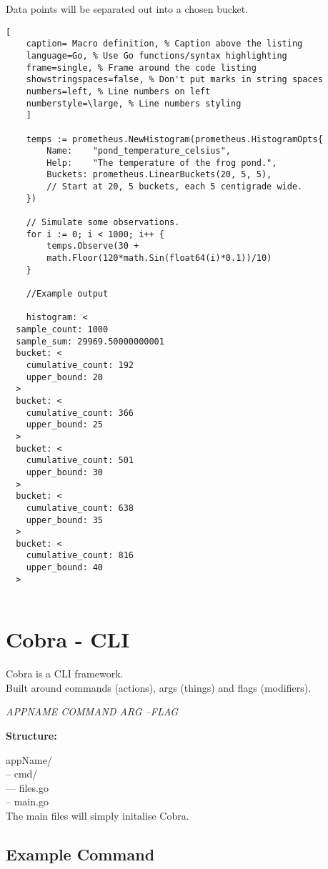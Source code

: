\documentclass[11pt]{scrartcl} %
\begin{document}
Data points will be separated out into a chosen bucket.

\begin{lstlisting}[
	caption= Macro definition, % Caption above the listing
	language=Go, % Use Go functions/syntax highlighting
	frame=single, % Frame around the code listing
	showstringspaces=false, % Don't put marks in string spaces
	numbers=left, % Line numbers on left
	numberstyle=\large, % Line numbers styling
	]

	temps := prometheus.NewHistogram(prometheus.HistogramOpts{
		Name:    "pond_temperature_celsius",
		Help:    "The temperature of the frog pond.", 
		Buckets: prometheus.LinearBuckets(20, 5, 5),  
		// Start at 20, 5 buckets, each 5 centigrade wide.
	})

	// Simulate some observations.
	for i := 0; i < 1000; i++ {
		temps.Observe(30 + 
		math.Floor(120*math.Sin(float64(i)*0.1))/10)
	}

	//Example output

	histogram: <
  sample_count: 1000
  sample_sum: 29969.50000000001
  bucket: <
    cumulative_count: 192
    upper_bound: 20
  >
  bucket: <
    cumulative_count: 366
    upper_bound: 25
  >
  bucket: <
    cumulative_count: 501
    upper_bound: 30
  >
  bucket: <
    cumulative_count: 638
    upper_bound: 35
  >
  bucket: <
    cumulative_count: 816
    upper_bound: 40
  >


\end{lstlisting}

\section{Cobra - CLI}

Cobra is a CLI framework. \\

Built around commands (actions), args (things) and flags (modifiers).

\begin{center}
	\textit{APPNAME COMMAND ARG --FLAG }
\end{center}

\textbf{Structure:}

appName/ \\
-- cmd/ \\
--- files.go \\
-- main.go \\

The main files will simply initalise Cobra.

\subsection{Example Command}
\end{document}
